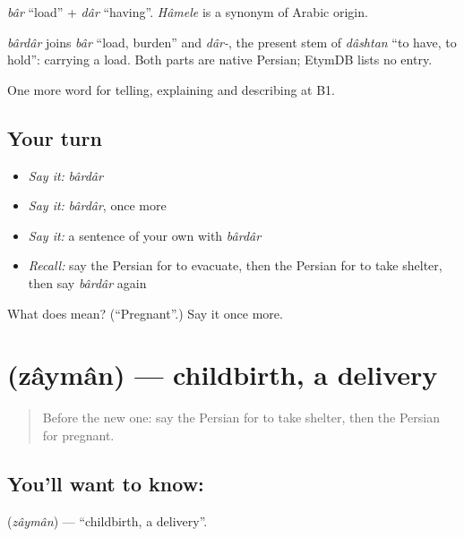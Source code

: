 \emph{bâr} \textquotedblleft{}load\textquotedblright{} + \emph{dâr} \textquotedblleft{}having\textquotedblright{}. \emph{Hâmele} is a synonym of Arabic origin.

\begin{cousinweb}
\emph{bârdâr} joins \emph{bâr} \textquotedblleft{}load, burden\textquotedblright{} and \emph{dâr-}, the present stem of \emph{dâshtan} \textquotedblleft{}to have, to hold\textquotedblright{}: carrying a load. Both parts are native Persian; EtymDB lists no entry.
\end{cousinweb}

\begin{grammarlens}[title={What you've built}]
One more word for telling, explaining and describing at B1.
\end{grammarlens}

\subsection*{Your turn}
\begin{itemize}
\raggedright
  \item \emph{Say it:} \emph{bârdâr}
  \item \emph{Say it:} \emph{bârdâr}, once more
  \item \emph{Say it:} a sentence of your own with \emph{bârdâr}
  \item \emph{Recall:} say the Persian for to evacuate, then the Persian for to take shelter, then say \emph{bârdâr} again
\end{itemize}

\begin{tcolorbox}[breakable,colback=teal!4,colframe=teal!35!black,title={Before you move on}]
What does  mean? (\textquotedblleft{}Pregnant\textquotedblright{}.) Say it once more.
\end{tcolorbox}
\section[\texorpdfstring{\fa{زایمان} (zâymân)}{زایمان (zâymân)}]{ (zâymân) — childbirth, a delivery}

\label{lesson:FA-C332-zayman}



\begin{quote}
Before the new one: say the Persian for to take shelter, then the Persian for pregnant.
\end{quote}

\subsection*{You'll want to know: }
\textbf{} (\emph{zâymân}) — \textquotedblleft{}childbirth, a delivery\textquotedblright{}.

